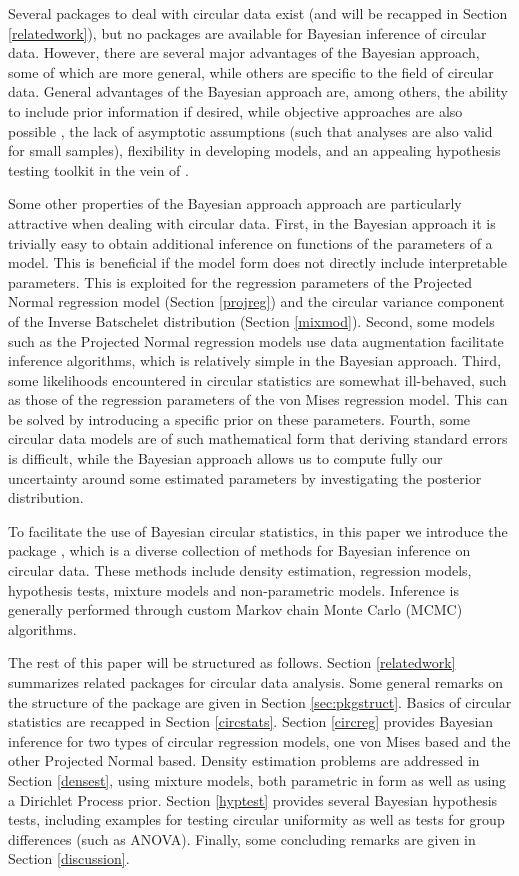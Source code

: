 Several packages to deal with circular data exist (and will be recapped
in Section \ref{relatedwork}), but no packages are available for
Bayesian inference of circular data. However, there are several major
advantages of the Bayesian approach, some of which are more general,
while others are specific to the field of circular data. General
advantages of the Bayesian approach are, among others, the ability to
include prior information if desired, while objective approaches are
also possible \citep{berger2006case}, the lack of asymptotic assumptions
(such that analyses are also valid for small samples), flexibility in
developing models, and an appealing hypothesis testing toolkit in the
vein of \citet{jeffreys1961theory}.

Some other properties of the Bayesian approach approach are particularly
attractive when dealing with circular data. First, in the Bayesian
approach it is trivially easy to obtain additional inference on
functions of the parameters of a model. This is beneficial if the model
form does not directly include interpretable parameters. This is
exploited for the regression parameters of the Projected Normal
regression model (Section \ref{projreg}) and the circular variance
component of the Inverse Batschelet distribution (Section \ref{mixmod}).
Second, some models such as the Projected Normal regression models use
data augmentation facilitate inference algorithms, which is relatively
simple in the Bayesian approach. Third, some likelihoods encountered in
circular statistics are somewhat ill-behaved, such as those of the
regression parameters of the von Mises regression model. This can be
solved by introducing a specific prior on these parameters. Fourth, some
circular data models are of such mathematical form that deriving
standard errors is difficult, while the Bayesian approach allows us to
compute fully our uncertainty around some estimated parameters by
investigating the posterior distribution.

To facilitate the use of Bayesian circular statistics, in this paper we
introduce the  package , which is a diverse
collection of methods for Bayesian inference on circular data. These
methods include density estimation, regression models, hypothesis tests,
mixture models and non-parametric models. Inference is generally
performed through custom Markov chain Monte Carlo (MCMC) algorithms.

The rest of this paper will be structured as follows. Section
\ref{relatedwork} summarizes related packages for circular data
analysis. Some general remarks on the structure of the package are given
in Section \ref{sec:pkgstruct}. Basics of circular statistics are
recapped in Section \ref{circstats}. Section \ref{circreg} provides
Bayesian inference for two types of circular regression models, one von
Mises based and the other Projected Normal based. Density estimation
problems are addressed in Section \ref{densest}, using mixture models,
both parametric in form as well as using a Dirichlet Process prior.
Section \ref{hyptest} provides several Bayesian hypothesis tests,
including examples for testing circular uniformity as well as tests for
group differences (such as ANOVA). Finally, some concluding remarks are
given in Section \ref{discussion}.

